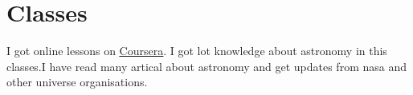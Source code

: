 \documentclass[letterpaper, 11pt]{article}
\newcommand{\secStartSpace}{\vspace{3pt}}
\newcommand{\secEndSpace}{\vspace{5pt}}
\begin{document}
\section{\color{blue} \textbf{Classes}}

\secStartSpace
I got online lessons on \href{https://www.coursera.org/}{\underline{Coursera}}. I got lot knowledge about astronomy in this classes.I have read many artical about astronomy and get updates from nasa and other universe organisations.
\secEndSpace
\end{document}
